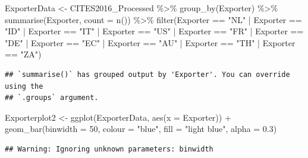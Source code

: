 \documentclass[
  12pt,
]{article}
\newenvironment{Shaded}{\begin{snugshade}}{\end{snugshade}}
\newcommand{\AttributeTok}[1]{\textcolor[rgb]{0.77,0.63,0.00}{#1}}
\newcommand{\DecValTok}[1]{\textcolor[rgb]{0.00,0.00,0.81}{#1}}
\newcommand{\FloatTok}[1]{\textcolor[rgb]{0.00,0.00,0.81}{#1}}
\newcommand{\FunctionTok}[1]{\textcolor[rgb]{0.00,0.00,0.00}{#1}}
\newcommand{\NormalTok}[1]{#1}
\newcommand{\OtherTok}[1]{\textcolor[rgb]{0.56,0.35,0.01}{#1}}
\newcommand{\SpecialCharTok}[1]{\textcolor[rgb]{0.00,0.00,0.00}{#1}}
\newcommand{\StringTok}[1]{\textcolor[rgb]{0.31,0.60,0.02}{#1}}
\begin{document}
\begin{Shaded}
\begin{Highlighting}[]
\NormalTok{ExporterData }\OtherTok{\textless{}{-}}\NormalTok{ CITES2016\_Processed }\SpecialCharTok{\%\textgreater{}\%}
    \FunctionTok{group\_by}\NormalTok{(Exporter) }\SpecialCharTok{\%\textgreater{}\%}
    \FunctionTok{summarise}\NormalTok{(Exporter, }\AttributeTok{count =} \FunctionTok{n}\NormalTok{()) }\SpecialCharTok{\%\textgreater{}\%}
    \FunctionTok{filter}\NormalTok{(Exporter }\SpecialCharTok{==} \StringTok{"NL"} \SpecialCharTok{|}\NormalTok{ Exporter }\SpecialCharTok{==} \StringTok{"ID"} \SpecialCharTok{|}\NormalTok{ Exporter }\SpecialCharTok{==} \StringTok{"IT"} \SpecialCharTok{|}\NormalTok{ Exporter }\SpecialCharTok{==} \StringTok{"US"} \SpecialCharTok{|}
\NormalTok{        Exporter }\SpecialCharTok{==} \StringTok{"FR"} \SpecialCharTok{|}\NormalTok{ Exporter }\SpecialCharTok{==} \StringTok{"DE"} \SpecialCharTok{|}\NormalTok{ Exporter }\SpecialCharTok{==} \StringTok{"EC"} \SpecialCharTok{|}\NormalTok{ Exporter }\SpecialCharTok{==} \StringTok{"AU"} \SpecialCharTok{|}
\NormalTok{        Exporter }\SpecialCharTok{==} \StringTok{"TH"} \SpecialCharTok{|}\NormalTok{ Exporter }\SpecialCharTok{==} \StringTok{"ZA"}\NormalTok{)}
\end{Highlighting}
\end{Shaded}

\begin{verbatim}
## `summarise()` has grouped output by 'Exporter'. You can override using the
## `.groups` argument.
\end{verbatim}

\begin{Shaded}
\begin{Highlighting}[]
\NormalTok{Exporterplot2 }\OtherTok{\textless{}{-}} \FunctionTok{ggplot}\NormalTok{(ExporterData, }\FunctionTok{aes}\NormalTok{(}\AttributeTok{x =}\NormalTok{ Exporter)) }\SpecialCharTok{+} \FunctionTok{geom\_bar}\NormalTok{(}\AttributeTok{binwidth =} \DecValTok{50}\NormalTok{,}
    \AttributeTok{colour =} \StringTok{"blue"}\NormalTok{, }\AttributeTok{fill =} \StringTok{"light blue"}\NormalTok{, }\AttributeTok{alpha =} \FloatTok{0.3}\NormalTok{)}
\end{Highlighting}
\end{Shaded}

\begin{verbatim}
## Warning: Ignoring unknown parameters: binwidth
\end{verbatim}
\end{document}
